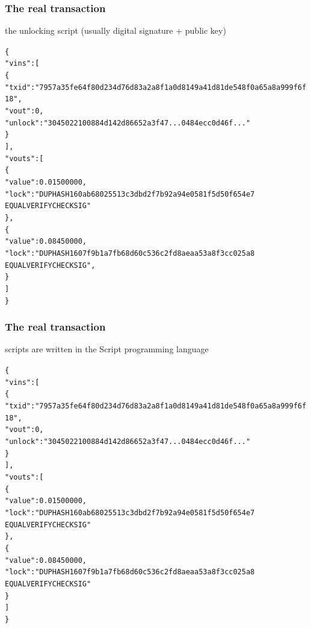\documentclass[11pt]{beamer}  %
\begin{document}
\begin{frame}[fragile]\frametitle{The real transaction}

  \begin{center}
    the unlocking script (usually digital signature + public key)
  \end{center}

  {\scriptsize\begin{alltt}
\{
  "vins": [
    \{
      "txid": "7957a35fe64f80d234d76d83a2a8f1a0d8149a41d81de548f0a65a8a999f6f18",
      "vout": 0,
      \alert{"unlock": "3045022100884d142d86652a3f47... 0484ecc0d46f..."}
    \}
  ],
  "vouts": [
    \{
      "value": 0.01500000,
      "lock": "DUP HASH160 ab68025513c3dbd2f7b92a94e0581f5d50f654e7
               EQUALVERIFY CHECKSIG"
    \},
    \{
      "value": 0.08450000,
      "lock": "DUP HASH160 7f9b1a7fb68d60c536c2fd8aeaa53a8f3cc025a8
               EQUALVERIFY CHECKSIG",
    \}
  ]
\}
\end{alltt}}

\end{frame}

\begin{frame}[fragile]\frametitle{The real transaction}

  \begin{center}
    scripts are written in the Script programming language
  \end{center}

  {\scriptsize\begin{alltt}
\{
  "vins": [
    \{
      "txid": "7957a35fe64f80d234d76d83a2a8f1a0d8149a41d81de548f0a65a8a999f6f18",
      "vout": 0,
      "unlock": \alert{"3045022100884d142d86652a3f47... 0484ecc0d46f..."}
    \}
  ],
  "vouts": [
    \{
      "value": 0.01500000,
      "lock": \alert{"DUP HASH160 ab68025513c3dbd2f7b92a94e0581f5d50f654e7
               EQUALVERIFY CHECKSIG"}
    \},
    \{
      "value": 0.08450000,
      "lock": \alert{"DUP HASH160 7f9b1a7fb68d60c536c2fd8aeaa53a8f3cc025a8
               EQUALVERIFY CHECKSIG"}
    \}
  ]
\}
\end{alltt}}

\end{frame}
\end{document}
